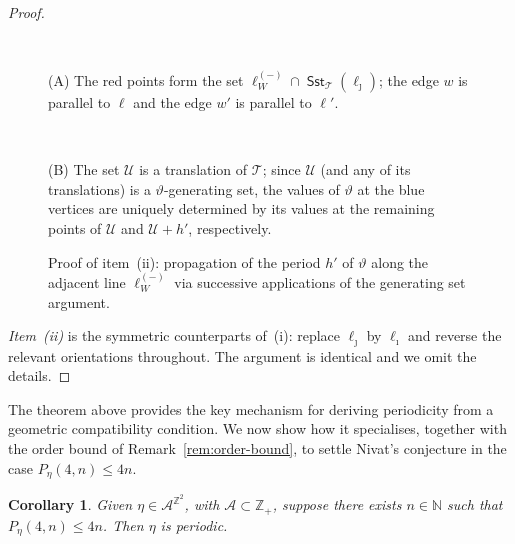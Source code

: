 \documentclass[12pt]{amsart}
\numberwithin{equation}{section}
\newtheorem{corollary}[theorem]{Corollary}
\DeclareMathOperator{\sst}{\mathsf{Sst}}
\newcommand{\bb}[1]{\mathbb{#1}}
\begin{document}
\begin{proof}
\begin{figure}[ht]
	\begin{minipage}[t]{0.47\linewidth}
		\begin{center}
			\def\svgwidth{7.8cm}\\
		\end{center}
		\small{(A) The red points form the set $\pmb{\ell}_W^{(-)} \cap \sst_\mathcal{T}(\pmb{\ell}_{\jmath})$;  the edge $w$ is parallel to $\pmb{\ell}$ and the edge $w'$ is parallel to $\pmb{\ell}'$.}
	\end{minipage} 
	\hfill
	\begin{minipage}[t]{0.47\linewidth}
		\begin{center}
			\def\svgwidth{7.8cm}\\
		\end{center}
		\small{(B) The set $\mathcal{U}$ is a translation of $\mathcal{T}$; since $\mathcal{U}$ (and any of its translations) is a $\vartheta$-generating set, the values of $\vartheta$ at the blue vertices are uniquely determined by its values at the remaining points of $\mathcal U$ and $\mathcal{U}+h'$, respectively.}
	\end{minipage}
	\caption{Proof of item~(ii): propagation of the period $h'$ of $\vartheta$ along the adjacent line $\pmb{\ell}_W^{(-)}$ via
successive applications of the generating set argument.}
	\label{fig4}
\end{figure}

\smallskip\noindent\textit{Item~(ii)} is the symmetric
counterparts of~(i): replace $\pmb{\ell}_\jmath$ by
$\pmb{\ell}_\imath$ and reverse the relevant orientations throughout.
The argument is identical and we omit the details.
\end{proof}

The theorem above provides the key mechanism for deriving periodicity from
a geometric compatibility condition. We now show how it specialises, together
with the order bound of Remark~\ref{rem:order-bound}, to settle Nivat's
conjecture in the case $P_\eta(4,n) \leq 4n$.

\begin{corollary}
Given $\eta \in \mathcal{A}^{\bb{Z}^2}$, with $\mathcal{A} \subset \bb{Z}_+$,
suppose there exists $n \in \bb{N}$ such that $P_{\eta}(4,n) \leq 4n$.
Then $\eta$ is periodic.
\end{corollary}
\end{document}
